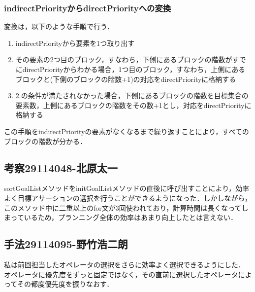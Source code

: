 \documentclass{jarticle}
\begin{document}
\subsubsection{indirectPriorityからdirectPriorityへの変換}
変換は，以下のような手順で行う．
\begin{enumerate}
\item indirectPriorityから要素を1つ取り出す
\item その要素の2つ目のブロック，すなわち，下側にあるブロックの階数がすでにdirectPriorityからわかる場合，1つ目のブロック，すなわち，上側にあるブロックと(下側のブロックの階数+1)の対応をdirectPriorityに格納する
\item 2.の条件が満たされなかった場合，下側にあるブロックの階数を目標集合の要素数，上側にあるブロックの階数をその数+1とし，対応をdirectPriorityに格納する
\end{enumerate}

この手順をindirectPriorityの要素がなくなるまで繰り返すことにより，すべてのブロックの階数が分かる．

\subsection{考察29114048-北原太一}
sortGoalListメソッドをinitGoalListメソッドの直後に呼び出すことにより，効率よく目標アサーションの選択を行うことができるようになった．しかしながら，このメソッド中に二重以上のfor文が3回使われており，計算時間は長くなってしまっているため，プランニング全体の効率はあまり向上したとは言えない．
\subsection{手法29114095-野竹浩二朗}
私は前回担当したオペレータの選択をさらに効率よく選択できるようにした．\\
オペレータに優先度をずっと固定ではなく，その直前に選択したオペレータによってその都度優先度を振りなおす．
\end{document}
